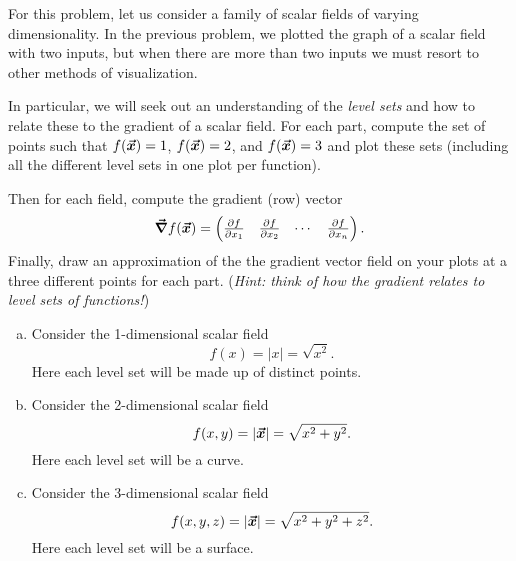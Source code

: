 \documentclass[12pt]{article} %
\begin{document}
\begin{problem}
For this problem, let us consider a family of scalar fields of varying dimensionality. In the previous problem, we plotted the graph of a scalar field with two inputs, but when there are more than two inputs we must resort to other methods of visualization.

In particular, we will seek out an understanding of the \emph{level sets} and how to relate these to the gradient of a scalar field. For each part, compute the set of points such that $f(\boldsymbol{\vec{x}})=1$, $f(\boldsymbol{\vec{x}})=2$, and $f(\boldsymbol{\vec{x}})=3$ and plot these sets (including all the different level sets in one plot per function). 

Then for each field, compute the gradient (row) vector
\[
\boldsymbol{\vec{\nabla}} f(\boldsymbol{\vec{x}}) = \begin{pmatrix} \frac{\partial f}{\partial x_1} & \frac{\partial f}{\partial x_2} & \cdots & \frac{\partial f}{\partial x_n}\end{pmatrix}.
\]
Finally, draw an approximation of the the gradient vector field on your plots at a three different points for each part. (\emph{Hint: think of how the gradient relates to level sets of functions!})
\begin{enumerate}[(a)]
	\item Consider the 1-dimensional scalar field 
	\[
	f(x) = |x| = \sqrt{x^2}.
	\]
	Here each level set will be made up of distinct points.
	\item Consider the 2-dimensional scalar field
	\[
	f(x,y) = |\boldsymbol{\vec{x}}| = \sqrt{x^2+y^2}.
	\]
	Here each level set will be a curve.
	\item Consider the 3-dimensional scalar field
		\[
		f(x,y,z) = |\boldsymbol{\vec{x}}| = \sqrt{x^2+y^2+z^2}.
		\]
		Here each level set will be a surface.
\end{enumerate}
\end{problem}
\end{document}
